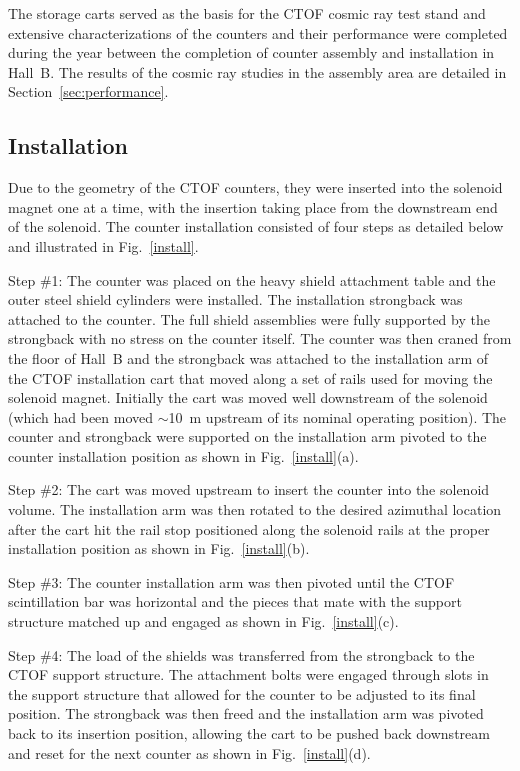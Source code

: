 \documentclass{elsart}
\begin{document}
The storage carts served as the basis for the CTOF cosmic ray test stand and extensive 
characterizations of the counters and their performance were completed during the year between 
the completion of counter assembly and installation in Hall~B. The results of the cosmic ray 
studies in the assembly area are detailed in Section~\ref{sec:performance}.

\subsection{Installation}
\label{installation}

Due to the geometry of the CTOF counters, they were inserted into the solenoid magnet one at a 
time, with the insertion taking place from the downstream end of the solenoid. The counter 
installation consisted of four steps as detailed below and illustrated in Fig.~\ref{install}.

Step \#1: The counter was placed on the heavy shield attachment table and the outer steel shield
cylinders were installed. The installation strongback was attached to the counter. The full shield 
assemblies were fully supported by the strongback with no stress on the counter itself. The 
counter was then craned from the floor of Hall~B and the strongback was attached to the installation
arm of the CTOF installation cart that moved along a set of rails used for moving the solenoid magnet.
Initially the cart was moved well downstream of the solenoid (which had been moved $\sim$10~m
upstream of its nominal operating position). The counter and strongback were supported on the
installation arm pivoted to the counter installation position as shown in Fig.~\ref{install}(a).

Step \#2: The cart was moved upstream to insert the counter into the solenoid volume. The
installation arm was then rotated to the desired azimuthal location after the cart hit the rail stop
positioned along the solenoid rails at the proper installation position as shown in Fig.~\ref{install}(b).

Step \#3: The counter installation arm was then pivoted until the CTOF scintillation bar was horizontal
and the pieces that mate with the support structure matched up and engaged as shown in Fig.~\ref{install}(c).

Step \#4: The load of the shields was transferred from the strongback to the CTOF support structure.
The attachment bolts were engaged through slots in the support structure that allowed for the counter to
be adjusted to its final position. The strongback was then freed and the installation arm was pivoted back
to its insertion position, allowing the cart to be pushed back downstream and reset for the next counter as
shown in Fig.~\ref{install}(d).
\end{document}
